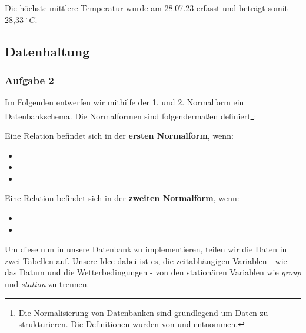 \documentclass[a4paper, 12pt]{article}
\begin{document}
\vspace{\baselineskip}

Die höchste mittlere Temperatur wurde am 28.07.23 erfasst und beträgt somit 28,33 \(^\circ C\).

\newpage
\subsection{Datenhaltung}

\subsubsection{Aufgabe 2}
Im Folgenden entwerfen wir mithilfe der 1. und 2. Normalform ein Datenbankschema. Die Normalformen sind folgendermaßen definiert\footnote{Die Normalisierung von Datenbanken sind grundlegend um Daten zu strukturieren. Die Definitionen wurden von \cite{4} und \cite{5} entnommen.}:

\vspace{\baselineskip} 

Eine Relation befindet sich in der \textbf{ersten Normalform}, wenn:

\begin{itemize}
   \item {}
   \item {}
   \item {}
\end{itemize}

\vspace{\baselineskip} 

Eine Relation befindet sich in der \textbf{zweiten Normalform}, wenn:

\begin{itemize}[rightmargin=0pt]
    \item {}
    \item {}
\end{itemize}

\vspace{\baselineskip} 

Um diese nun in unsere Datenbank zu implementieren, teilen wir die Daten in zwei Tabellen auf. Unsere Idee dabei ist es, die zeitabhängigen Variablen - wie das Datum und die Wetterbedingungen - von den stationären Variablen wie \textit{group} und \textit{station} zu trennen.
\end{document}
